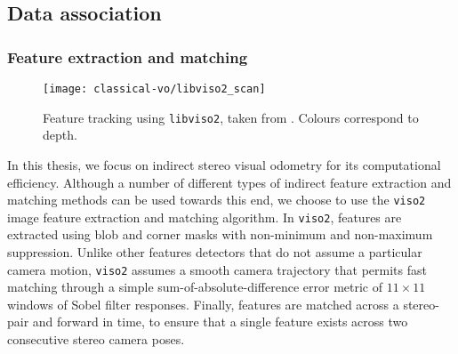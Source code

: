 \subsection{Data association}

\subsubsection{Feature extraction and matching}

\begin{figure}[h!]
\begin{center}
		\texttt{[image: classical-vo/libviso2\_scan]}
		\caption{Feature tracking using \texttt{libviso2}, taken from \cite{Geiger2011-xe}. Colours correspond to depth.}
  	\label{fig:vo_feature_tracking}
\end{center}
\end{figure}

In this thesis, we focus on indirect stereo visual odometry for its computational efficiency. Although a number of different types of indirect feature extraction and matching methods can be used towards this end, we choose to use the \texttt{viso2} \citep{geiger2011stereoscan} image feature extraction and matching algorithm. In \texttt{viso2}, features are extracted using blob and corner masks with non-minimum and non-maximum suppression. Unlike other features detectors that do not assume a particular camera motion, \texttt{viso2} assumes a smooth camera trajectory that permits fast matching through a simple sum-of-absolute-difference error metric of $11 \times 11$ windows of Sobel filter responses. Finally, features are matched across a stereo-pair and forward in time, to ensure that a single feature exists across two consecutive stereo camera poses. 

